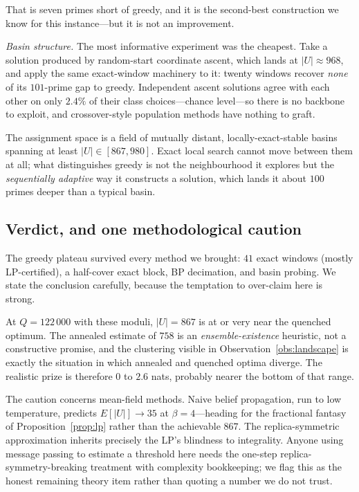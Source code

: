 That is seven primes short of greedy, and it is the second-best construction we
know for this instance---but it is not an improvement.

\emph{Basin structure.} The most informative experiment was the cheapest. Take a
solution produced by random-start coordinate ascent, which lands at
$|U|\approx968$, and apply the same exact-window machinery to it: twenty
windows recover \emph{none} of its $101$-prime gap to greedy. Independent ascent
solutions agree with each other on only $2.4\%$ of their class choices---chance
level---so there is no backbone to exploit, and crossover-style population
methods have nothing to graft.

\begin{observation}\label{obs:landscape}
The assignment space is a field of mutually distant, locally-exact-stable
basins spanning at least $|U|\in[867,980]$. Exact local search cannot move
between them at all; what distinguishes greedy is not the neighbourhood it
explores but the \emph{sequentially adaptive} way it constructs a solution,
which lands it about $100$ primes deeper than a typical basin.
\end{observation}

\subsection{Verdict, and one methodological caution}

The greedy plateau survived every method we brought: $41$ exact windows (mostly
LP-certified), a half-cover exact block, BP decimation, and basin probing. We
state the conclusion carefully, because the temptation to over-claim here is
strong.

\begin{observation}\label{obs:door1}
At $Q=122\,000$ with these moduli, $|U|=867$ is at or very near the quenched
optimum. The annealed estimate of $758$ is an \emph{ensemble-existence}
heuristic, not a constructive promise, and the clustering visible in
Observation~\ref{obs:landscape} is exactly the situation in which annealed and
quenched optima diverge. The realistic prize is therefore $0$ to $2.6$ nats,
probably nearer the bottom of that range.
\end{observation}

The caution concerns mean-field methods. Naive belief propagation, run to low
temperature, predicts $E[|U|]\to35$ at $\beta=4$---heading for the fractional
fantasy of Proposition~\ref{prop:lp} rather than the achievable $867$. The
replica-symmetric approximation inherits precisely the LP's blindness to
integrality. Anyone using message passing to estimate a threshold here needs the
one-step replica-symmetry-breaking treatment with complexity bookkeeping; we
flag this as the honest remaining theory item rather than quoting a number we do
not trust.

